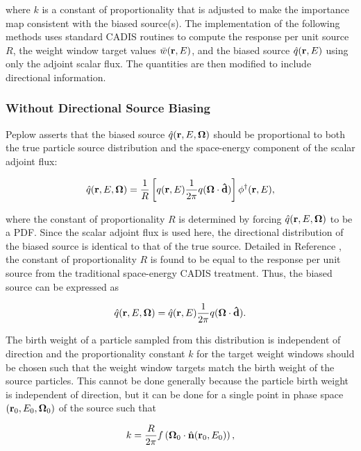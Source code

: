 \noindent where $k$ is a constant of proportionality that is adjusted to make the
importance map consistent with the biased source(s). The implementation of the
following methods uses standard CADIS routines to compute the response per unit 
source $R$, the weight window target values $\bar{w}(\textbf{r},E)$, and the biased source 
$\hat{q}(\textbf{r},E)$ using only the adjoint scalar flux. The quantities are then
modified to include directional information.

\subsubsection{Without Directional Source Biasing}

Peplow asserts that the biased source $\hat{q}(\textbf{r},E,\mathbf\Omega)$ should be proportional
to both the true particle source distribution and the space-energy component of the
scalar adjoint flux:

\begin{equation}
\hat{q}(\textbf{r},E,\mathbf\Omega) = \frac{1}{R}
\left[q(\textbf{r},E)\frac{1}{2\pi}q(\mathbf\Omega\cdot\mathbf{\hat{d}})\right]
\phi^{\dagger}(\textbf{r},E),
\end{equation}

\noindent where the constant of proportionality $R$ is determined by forcing
$\hat{q}(\textbf{r},E,\mathbf\Omega)$ to be a PDF. Since the scalar adjoint flux is used here, the
directional distribution of the biased source is identical to that of the true source.
Detailed in Reference \cite{peplow}, the constant of proportionality $R$ is found to be equal to
the response per unit source from the traditional space-energy CADIS treatment. Thus,
the biased source can be expressed as

\begin{equation}
\hat{q}(\textbf{r},E,\mathbf\Omega) = \hat{q}(\textbf{r},E)\frac{1}{2\pi}q(\mathbf\Omega\cdot\mathbf{\hat{d}}). 
\end{equation}

The birth weight of a particle sampled from this distribution is independent of
direction and the proportionality constant $k$ for the target weight windows should be
chosen such that the weight window targets match the birth weight of the source
particles. This cannot be done generally because the particle birth weight is
independent of direction, but it can be done for a single point in phase space
$(\textbf{r}_0,E_0,\mathbf\Omega_0)$ of the source such that

\begin{equation}
k = \frac{R}{2\pi}f\left(\mathbf\Omega_0\cdot\hat{\mathbf{n}}(\textbf{r}_0,E_0)\right),
\end{equation}

